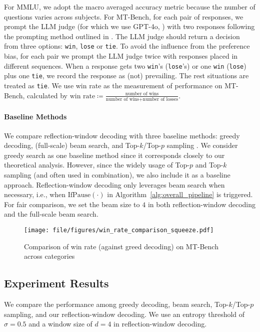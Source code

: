 For MMLU, we adopt the macro averaged accuracy metric because the number of questions varies across subjects.
For MT-Bench, for each pair of responses, we prompt the LLM judge (for which we use GPT-4o, \citealt{openai2024gpt4o}) with two responses following the prompting method outlined in \citet{zheng2023judging}.
The LLM judge should return a decision from three options: \texttt{win}, \texttt{lose} or \texttt{tie}.
To avoid the influence from the preference bias, for each pair we prompt the LLM judge twice with responses placed in different sequences.
When a response gets two \texttt{win}'s (\texttt{lose}'s) or one \texttt{win} (\texttt{lose}) plus one \texttt{tie}, we record the response as (not) prevailing.
The rest situations are treated as \texttt{tie}.
We use win rate as the measurement of performance on MT-Bench, calculated by $\text{win rate} \coloneqq \frac{\text{number of wins}}{\text{number of wins}+\text{number of losses}}$.


\paragraph{Baseline Methods}
We compare reflection-window decoding with three baseline methods: greedy decoding, (full-scale) beam search, and Top-$k$/Top-$p$ sampling \citep{fan2018hierarchical,holtzman2020curious}.
We consider greedy search as one baseline method since it corresponds closely to our theoretical analysis.
However, since the widely usage of Top-$p$ and Top-$k$ sampling (and often used in combination), we also include it as a baseline approach.
Reflection-window decoding only leverages beam search when necessary, i.e., when $\mathrm{IfPause(\cdot)}$ in Algorithm~\ref{alg:overall_pipeline} is triggered.
For fair comparison, we set the beam size to $4$ in both reflection-window decoding and the full-scale beam search.



\begin{figure}[t]
    \centering
    \texttt{[image: file/figures/win\_rate\_comparison\_squeeze.pdf]}
    \caption{%
        Comparison of win rate (against greed decoding) on MT-Bench across categories}
    \label{fig:winrate_comparison}
\end{figure}

\subsection{Experiment Results}\label{main:experiments:experiment_results}
We compare the performance among greedy decoding, beam search, Top-$k$/Top-$p$ sampling, and our reflection-window decoding.
We use an entropy threshold of $\sigma=0.5$ and a window size of $d=4$ in reflection-window decoding.

